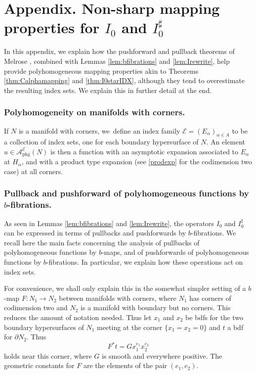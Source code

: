 \documentclass[JEP,XML,SOM,Unicode,NoFloatCountersInSection, NoEqCountersInSection,published]{cedram}
\theoremstyle{plain}
\theoremstyle{definition}
\theoremstyle{remark}
\def\A{\mathcal{A}}
\newcommand{\calE}{\mathcal E}
\newcommand{\adj}{I_0^\sharp}
\newcommand{\del}{\partial}
\begin{document}
\appendix

\section*{Appendix. Non-sharp mapping properties for \texorpdfstring{$I_0$ and $\adj$}{adj}}\label{sec:PFT}

In this appendix, we explain how the pushforward and pullback theorems of Melrose \cite{Melrose1992}, combined with Lemmas \ref{lem:bfibrations} and \ref{lem:Irewrite}, help provide polyhomogeneous mapping properties akin to Theorems \ref{thm:Calphamapping} and \ref{thm:I0starIDX}, although they tend to overestimate the resulting index sets. We explain this in further detail at the end.

\subsubsection*{Polyhomogeneity on manifolds with corners.} If $N$ is a manifold with corners, we~defi\-ne an index family $\calE = (E_\alpha)_{\alpha \in A}$ to be a collection of index sets, one for each boundary hypersurface of $N$. An element $u \in \A^{\calE}_{\mathrm{phg}}(N)$ is then a function with an asymptotic expansion associated to $E_\alpha$ at $H_\alpha$, and with a product type expansion (see \eqref{prodexp} for the codimension two case) at all corners.

\subsubsection*{Pullback and pushforward of polyhomogeneous functions by $b$-fibrations.} As seen in Lemmas \ref{lem:bfibrations} and \ref{lem:Irewrite}, the operators $I_0$ and $\adj$ can be expressed in terms of pullbacks and pushforwards by $b$-fibrations. We recall here the main facts concerning the analysis of pullbacks of polyhomogeneous functions by $b$-maps, and of pushforwards of polyhomogeneous functions by $b$-fibrations. In particular, we explain how these operations act on index sets.

For convenience, we shall only explain this in the somewhat simpler setting of a $b$-map $F\colon N_1 \to N_2$ between manifolds with corners, where $N_1$ has corners of codimension two and $N_2$ is a manifold with boundary but no corners. This reduces the amount of notation needed. Thus let $x_1$ and $x_2$ be bdfs for the two boundary hypersurfaces of $N_1$ meeting at the corner $\{x_1 = x_2 = 0\}$ and $t$ a bdf for $\del N_2$. Thus
\[
F^* t = G x_1^{e_1} x_2^{e_2}
\]
holds near this corner, where $G$ is smooth and everywhere positive. The geometric constants for $F$ are the elements of the pair $(e_1, e_2)$.
\end{document}
